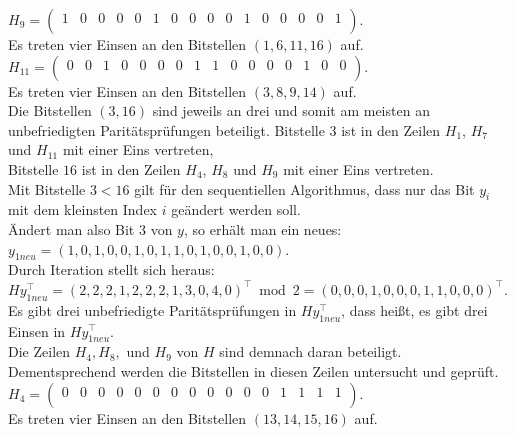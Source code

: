 \begin{Beispiel}
    $H_9= \left( \begin{array}{rrrrrrrrrrrrrrrr}
        1 & 0 & 0 & 0 & 0 & 1 & 0 & 0 & 0 & 0 & 1 & 0 & 0 & 0 & 0 & 1 \\
       \end{array}\right). 
    $\\
    Es treten vier Einsen an den Bitstellen $(1, 6, 11, 16)$ auf.\\
    
    $H_{11}= \left( \begin{array}{rrrrrrrrrrrrrrrr}
        0 & 0 & 1 & 0 & 0 & 0 & 0 & 1 & 1 & 0 & 0 & 0 & 0 & 1 & 0 & 0 \\
       \end{array}\right). 
    $\\
    Es treten vier Einsen an den Bitstellen $(3, 8, 9, 14)$ auf.\\
    
    Die Bitstellen $(3, 16)$ sind jeweils an drei und somit am meisten an unbefriedigten Paritätsprüfungen beteiligt.
    Bitstelle $3$ ist in den Zeilen $H_1$, $H_7$ und $H_{11}$ mit einer Eins vertreten,\\
    Bitstelle $16$ ist in den Zeilen $H_4$, $H_8$ und $H_9$ mit einer Eins vertreten.\\
    Mit Bitstelle $3 < 16$ gilt für den sequentiellen Algorithmus, dass nur das Bit $y_i$ mit dem kleinsten Index $i$ geändert werden soll.\\
    
    Ändert man also Bit $3$ von $y$, so erhält man ein neues:\\
    $y_{1neu} = (1,0,1,0,0,1,0,1,1,0,1,0,0,1,0,0).$\\
    
    Durch Iteration stellt sich heraus:\\
    $Hy_{1neu}^\intercal = (2,2,2,1,2,2,2,1,3,0,4,0)^\intercal \bmod 2 = (0,0,0,1,0,0,0,1,1,0,0,0)^\intercal$.\\
    
    Es gibt drei unbefriedigte Paritätsprüfungen in $Hy_{1neu}^\intercal$, 
    dass hei\ss{}t, es gibt drei Einsen in $Hy_{1neu}^\intercal.$\\
    Die Zeilen $H_4, H_8,$ und $H_9$ von $H$ sind demnach daran beteiligt.\\ 
    Dementsprechend werden die Bitstellen in diesen Zeilen untersucht und geprüft.\\
    
    $H_4= \left( \begin{array}{rrrrrrrrrrrrrrrr}
        0 & 0 & 0 & 0 & 0 & 0 & 0 & 0 & 0 & 0 & 0 & 0 & 1 & 1 & 1 & 1 \\
       \end{array}\right). 
    $\\
    Es treten vier Einsen an den Bitstellen $(13, 14, 15, 16)$ auf.\\
    

\end{Beispiel}
